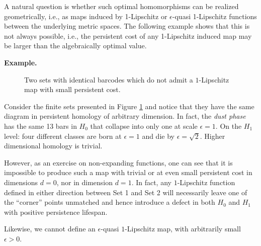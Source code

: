 \documentclass[11pt]{article}
\begin{document}
A natural question is whether such optimal homomorphisms can be realized geometrically, i.e., as maps induced by 1-Lipschitz or \(\epsilon\)-quasi 1-Lipschitz functions between the underlying metric spaces. The following example shows that this is not always possible, i.e., the persistent cost of any 1-Lipschitz induced map may be larger than the algebraically optimal value.

\bigskip
\noindent\textbf{Example.}
\begin{figure}[ht] 
\centering
{}
\quad
{}
\label{fig 2sets}
\caption{Two sets 
with identical barcodes which do not admit a $1$-Lipschitz map with small persistent cost.}
\end{figure}
Consider the finite sets presented in Figure \ref{fig 2sets} and notice that they have the same diagram in persistent homology of arbitrary dimension. 
In fact, the \textit{dust phase} has the same 13 bars in $H_0$ that collapse into only one at scale $\epsilon=1$. 
On the $H_1$ level: four different classes are born at $\epsilon=1$ and die by $\epsilon=\sqrt{2}$. Higher dimensional homology is trivial. 

However, as an exercise on non-expanding functions, one can see that it is impossible to produce such a map with trivial or at even small persistent cost in dimensions $d=0$, nor in dimension $d=1$. In fact, any $1$-Lipschitz function defined in either direction between Set 1 and Set 2 will necessarily leave one of the \enquote{corner} points unmatched and hence introduce a defect in both $H_0$ and $H_1$ with positive persistence lifespan. 

Likewise, we cannot define an $\epsilon$-quasi $1$-Lipschitz map, with arbitrarily small $\epsilon>0$. 




\end{document}
